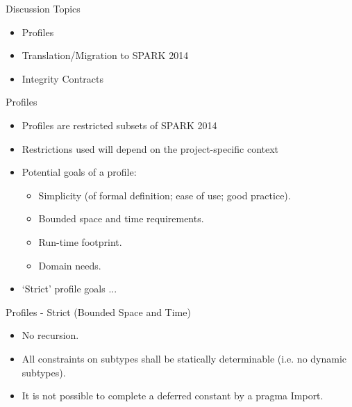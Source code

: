 \documentclass{beamer}
\begin{document}
\begin{frame}{Discussion Topics}

  \begin{itemize}

  \item Profiles
  \item Translation/Migration to SPARK 2014
  \item Integrity Contracts

  \end{itemize}

\end{frame}

\begin{frame}{Profiles}

  \begin{itemize}

  \item Profiles are restricted subsets of SPARK 2014

  \item Restrictions used will depend on the project-specific context

  \item Potential goals of a profile:

    \begin{itemize}

    \item Simplicity (of formal definition; ease of use; good practice).

    \item Bounded space and time requirements.

    \item Run-time footprint.

    \item Domain needs.

    \end{itemize}

  \item `Strict' profile goals ...

  \end{itemize}

\end{frame}

\begin{frame}{Profiles - Strict (Bounded Space and Time)}

  \begin{itemize}

  \item No recursion.

  \item All constraints on subtypes shall be statically determinable
        (i.e. no dynamic subtypes).

  \item It is not possible to complete a deferred constant by a pragma Import.

  \end{itemize}
\end{frame}
\end{document}
